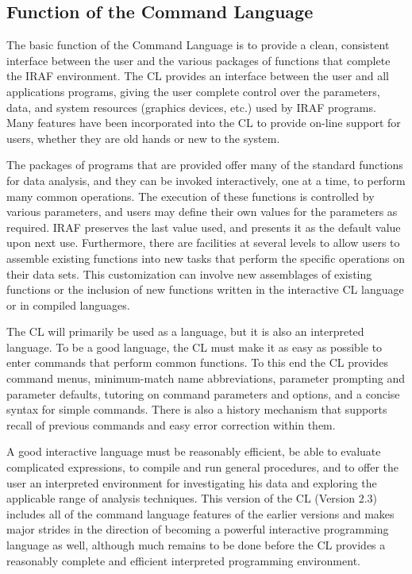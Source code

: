\subsection{Function of the Command Language}

\ppind
The basic function of the Command Language is to 
provide a clean, consistent interface between the user and the various
packages of functions that complete the IRAF environment.
The CL provides an interface between the user and all applications
programs, giving the user complete control over the parameters, data, and
system resources (graphics devices, etc.) used by IRAF programs.
Many features have been incorporated into the CL to provide
on-line support for users, whether they are old hands or new to the system. 

The packages of programs that are provided offer
many of the standard functions for data analysis, and they can 
be invoked interactively, one at a time, to perform many common 
operations.  The execution of these functions is controlled
by various parameters, and users may define their
own values for the parameters as required.  IRAF preserves the 
last value used, and presents it as the default value upon next
use.  Furthermore, there are facilities at several levels to allow
users to assemble existing functions into new tasks that perform
the specific operations on their data sets.  This
customization can involve new assemblages of existing functions
or the inclusion of new functions written in the interactive CL
language or in compiled languages.

The CL will primarily be used as a  language, 
but it is also an interpreted  language.
To be a good   language, the CL must make
it as easy as possible to enter commands that perform common functions.
To this end the CL provides command menus, minimum-match name abbreviations,
parameter prompting and parameter defaults, tutoring on command parameters
and options, and a concise syntax for simple commands.
There is also a history mechanism that supports recall of previous commands
and easy error correction within them.

A good interactive   language must
be reasonably efficient, be able to evaluate complicated expressions,
to compile and run general procedures, and to offer the user an interpreted
environment for investigating his data and exploring the applicable
range of analysis techniques.  This version of the CL (Version 2.3) includes
all of the command language features of the earlier versions and makes
major strides in the direction of becoming a powerful interactive
programming language as well, although much remains to be done before the
CL provides a reasonably complete and efficient interpreted programming
environment.

